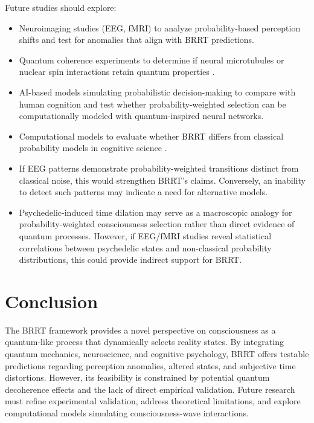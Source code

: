 \documentclass{article}
\begin{document}
Future studies should explore:
\begin{itemize}
    \item Neuroimaging studies (EEG, fMRI) to analyze probability-based perception shifts and test for anomalies that align with BRRT predictions.
    \item Quantum coherence experiments to determine if neural microtubules or nuclear spin interactions retain quantum properties \cite{hameroff2014consciousness}.
    \item AI-based models simulating probabilistic decision-making to compare with human cognition and test whether probability-weighted selection can be computationally modeled with quantum-inspired neural networks.
    \item Computational models to evaluate whether BRRT differs from classical probability models in cognitive science \cite{tegmark2015consciousness}.
    \item If EEG patterns demonstrate probability-weighted transitions distinct from classical noise, this would strengthen BRRT’s claims. Conversely, an inability to detect such patterns may indicate a need for alternative models.
    \item Psychedelic-induced time dilation may serve as a macroscopic analogy for probability-weighted consciousness selection rather than direct evidence of quantum processes. However, if EEG/fMRI studies reveal statistical correlations between psychedelic states and non-classical probability distributions, this could provide indirect support for BRRT.
\end{itemize}

\section{Conclusion}
The BRRT framework provides a novel perspective on consciousness as a quantum-like process that dynamically selects reality states. By integrating quantum mechanics, neuroscience, and cognitive psychology, BRRT offers testable predictions regarding perception anomalies, altered states, and subjective time distortions. However, its feasibility is constrained by potential quantum decoherence effects and the lack of direct empirical validation. Future research must refine experimental validation, address theoretical limitations, and explore computational models simulating consciousness-wave interactions.



\end{document}
